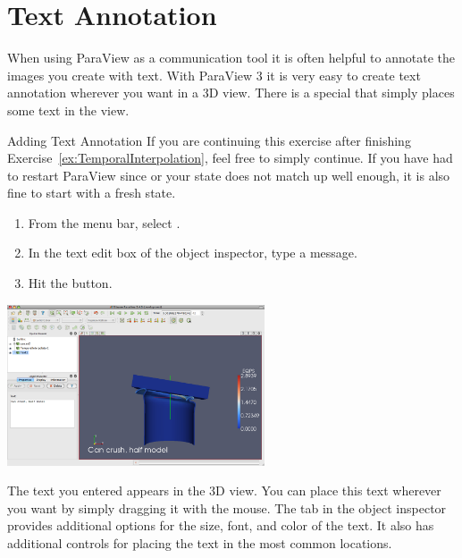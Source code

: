 \section{Text Annotation}


When using ParaView as a communication tool it is often helpful to annotate
the images you create with text.  With ParaView 3 it is very easy to create
text annotation wherever you want in a 3D view.  There is a special
 that simply places some text in the view.

\begin{exercise}{Adding Text Annotation}
  \label{ex:AddingTextAnnotation}%
  If you are continuing this exercise after finishing
  Exercise~\ref{ex:TemporalInterpolation}, feel free to simply continue.
  If you have had to restart ParaView since or your state does not match up
  well enough, it is also fine to start with a fresh state.

  \begin{enumerate}
  \item From the menu bar, select  \ra {}.
  \item In the text edit box of the object inspector, type a message.
  \item Hit the \apply button.
  \end{enumerate}

  \begin{inlinefig}
    \includegraphics[width=3in]{images/TextSource}
  \end{inlinefig}

  The text you entered appears in the 3D view.  You can place this text
  wherever you want by simply dragging it with the mouse.  The
   tab in the object inspector provides additional options for
  the size, font, and color of the text.  It also has additional controls
  for placing the text in the most common locations.


\end{exercise}
